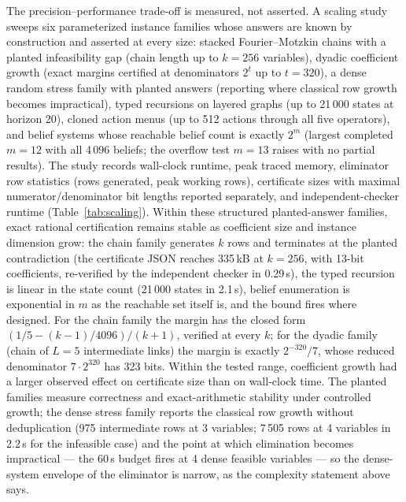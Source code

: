 \documentclass[3p,11pt]{elsarticle}
\begin{document}
The precision--performance trade-off is measured, not asserted. A scaling
study sweeps six parameterized instance families whose answers are known
by construction and asserted at every size: stacked Fourier--Motzkin
chains with a planted infeasibility gap (chain length up to $k = 256$
variables), dyadic coefficient growth (exact margins certified at
denominators $2^{t}$ up to $t = 320$), a dense random stress family with
planted answers (reporting where classical row growth becomes
impractical), typed recursions on layered graphs (up to 21\,000 states at
horizon 20), cloned action menus (up to 512 actions through all five
operators), and belief systems whose reachable belief count is exactly
$2^{m}$ (largest completed $m = 12$ with all 4\,096 beliefs; the
overflow test $m = 13$ raises with no partial results). The study records
wall-clock runtime, peak traced memory, eliminator row statistics (rows
generated, peak working rows), certificate sizes with maximal
numerator/denominator bit lengths reported separately, and
independent-checker runtime (Table~\ref{tab:scaling}). Within these
structured planted-answer families, exact rational certification remains
stable as coefficient size and instance dimension grow: the chain family
generates $k$ rows and terminates at the planted contradiction (the
certificate JSON reaches 335\,kB at $k = 256$, with 13-bit coefficients,
re-verified by the independent checker in 0.29\,s), the typed recursion
is linear in the state count (21\,000 states in 2.1\,s), belief
enumeration is exponential in $m$ as the reachable set itself is, and the
bound fires where designed. For the chain family the margin has the
closed form $(1/5 - (k-1)/4096)/(k+1)$, verified at every $k$; for the
dyadic family (chain of $L = 5$ intermediate links) the margin is
exactly $2^{-320}/7$, whose reduced denominator $7 \cdot 2^{320}$ has
323 bits. Within the tested range, coefficient growth had a larger
observed effect on certificate size than on wall-clock time. The planted
families measure correctness and exact-arithmetic stability under
controlled growth; the dense stress family reports the classical row
growth without deduplication (975 intermediate rows at 3 variables;
7\,505 rows at 4 variables in 2.2\,s for the infeasible case) and the
point at which elimination becomes impractical --- the 60\,s budget
fires at 4 dense feasible variables --- so the dense-system envelope of
the eliminator is narrow, as the complexity statement above says.
\end{document}
